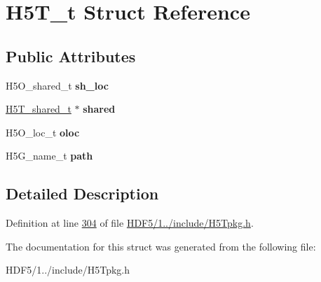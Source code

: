 \hypertarget{struct_h5_t__t}{}\section{H5\+T\+\_\+t Struct Reference}
\label{struct_h5_t__t}
\subsection*{Public Attributes}
\begin{DoxyCompactItemize}
\item 
\mbox{\label{struct_h5_t__t_a7592c5e4a87aead56667ad745d5cae1e}} 
H5\+O\+\_\+shared\+\_\+t {\bfseries sh\+\_\+loc}
\item 
\mbox{\label{struct_h5_t__t_a785a8fba49fa1a6fe7637120f87d2cb1}} 
\hyperlink{struct_h5_t__shared__t}{H5\+T\+\_\+shared\+\_\+t} $\ast$ {\bfseries shared}
\item 
\mbox{\label{struct_h5_t__t_ad6f4c6893ab75ae3d7f864542381ed8c}} 
H5\+O\+\_\+loc\+\_\+t {\bfseries oloc}
\item 
\mbox{\label{struct_h5_t__t_afa281b119c330f3d1a6c5f5b2b32cc7f}} 
H5\+G\+\_\+name\+\_\+t {\bfseries path}
\end{DoxyCompactItemize}


\subsection{Detailed Description}


Definition at line \hyperlink{_h_d_f5_21_810_81_2include_2_h5_tpkg_8h_source_l00304}{304} of file \hyperlink{_h_d_f5_21_810_81_2include_2_h5_tpkg_8h_source}{H\+D\+F5/1../include/\+H5\+Tpkg.\+h}.



The documentation for this struct was generated from the following file\+:\begin{DoxyCompactItemize}
\item 
H\+D\+F5/1../include/\+H5\+Tpkg.\+h\end{DoxyCompactItemize}
